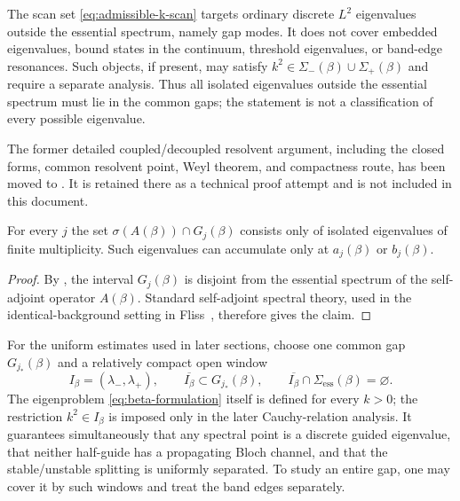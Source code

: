 \begin{remark}
The scan set \eqref{eq:admissible-k-scan} targets ordinary discrete $L^2$
eigenvalues outside the essential spectrum, namely gap modes.  It does not
cover embedded eigenvalues, bound states in the continuum, threshold
eigenvalues, or band-edge resonances.  Such objects, if present, may satisfy
$k^2\in\Sigma_-(\beta)\cup\Sigma_+(\beta)$ and require a separate analysis.
Thus all isolated eigenvalues outside the essential spectrum must lie in the
common gaps; the statement is not a classification of every possible
eigenvalue.
\end{remark}

The former detailed coupled/decoupled resolvent argument, including the closed
forms, common resolvent point, Weyl theorem, and compactness route, has been
moved to
.  It is retained
there as a technical proof attempt and is not included in this document.

\begin{proposition}
\label{prop:gap-discrete-spectrum}
For every $j$ the set $\sigma(A(\beta))\cap G_j(\beta)$ consists only of isolated
eigenvalues of finite multiplicity.  Such eigenvalues can accumulate only at
$a_j(\beta)$ or $b_j(\beta)$.
\end{proposition}
\begin{proof}
By , the interval $G_j(\beta)$ is
disjoint from the essential spectrum of the self-adjoint operator
$A(\beta)$.  Standard self-adjoint spectral theory,
used in the identical-background setting in
Fliss~\cite[Proposition~3.3]{Fliss2013}, therefore gives the claim.
\end{proof}

For the uniform estimates used in later sections, choose one common gap
$G_{j_*}(\beta)$ and a relatively compact open window
\begin{equation}
  I_\beta=(\lambda_-,\lambda_+),\qquad
  \overline{I_\beta}\subset G_{j_*}(\beta),\qquad
  \overline{I_\beta}\cap\Sigma_{\mathrm{ess}}(\beta)=\varnothing.
  \label{eq:strict-gap}
\end{equation}
The eigenproblem \eqref{eq:beta-formulation} itself is defined for every
$k>0$; the restriction $k^2\in I_\beta$ is imposed only in the later
Cauchy-relation analysis.  It guarantees simultaneously that any spectral
point is a discrete guided eigenvalue, that neither half-guide has a
propagating Bloch channel, and that the stable/unstable splitting is uniformly
separated.  To study an entire gap, one may cover it by such windows and treat
the band edges separately.

